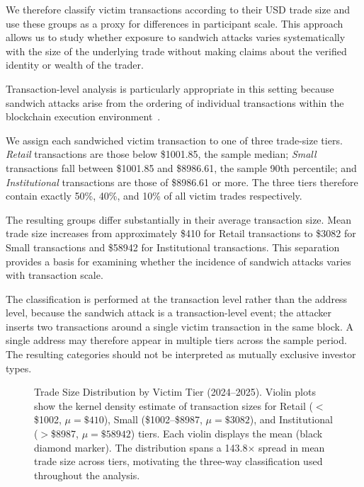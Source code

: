 \documentclass[pdflatex, sn-basic]{sn-jnl}
\theoremstyle{thmstylethree}%
\begin{document}
    We therefore classify victim transactions according to their USD trade size and use these groups as a proxy for differences in participant scale.
    This approach allows us to study whether exposure to sandwich attacks varies systematically with the size of the underlying trade without making claims about the verified identity or wealth of the trader.

    Transaction-level analysis is particularly appropriate in this setting because sandwich attacks arise from the ordering of individual transactions within the blockchain execution environment~\citep{Daian2020,Heimbach2022}.

    We assign each sandwiched victim transaction to one of three trade-size tiers.
    \emph{Retail} transactions are those below \$\num{1001.85}, the sample median; \emph{Small} transactions fall between \$\num{1001.85} and \$\num{8986.61}, the sample 90th percentile; and \emph{Institutional} transactions are those of \$\num{8986.61} or more.
    The three tiers therefore contain exactly \num{50}\%, \num{40}\%, and \num{10}\% of all victim trades respectively.

    The resulting groups differ substantially in their average transaction size.
    Mean trade size increases from approximately \$\num{410} for Retail transactions to \$\num{3082} for Small transactions and \$\num{58942} for Institutional transactions.
    This separation provides a basis for examining whether the incidence of sandwich attacks varies with transaction scale.

    The classification is performed at the transaction level rather than the address level, because the sandwich attack is a transaction-level event; the attacker inserts two transactions around a single victim transaction in the same block.
    A single address may therefore appear in multiple tiers across the sample period.
    The resulting categories should not be interpreted as mutually exclusive investor types.
    
	\begin{figure}[t]
		\centering
		
		\caption{Trade Size Distribution by Victim Tier (2024--2025).
		Violin plots show the kernel density estimate of transaction sizes for Retail ($<$\$\num{1002}, $\mu=\$\num{410}$), Small (\$\num{1002}--\$\num{8987}, $\mu=\$\num{3082}$), and Institutional ($>$\$\num{8987}, $\mu=\$\num{58942}$) tiers.
		Each violin displays the mean (black diamond marker).
		The distribution spans a \num{143.8}$\times$ spread in mean trade size across tiers, motivating the three-way classification used throughout the analysis.}
		\label{fig:trade-size-distribution}
	\end{figure}
\end{document}
